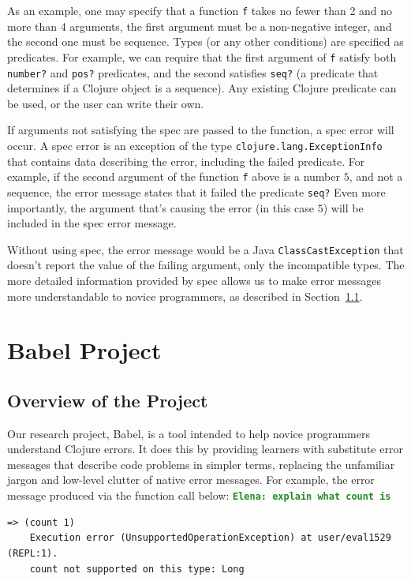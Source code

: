 \documentclass[12pt]{article}
\newcommand{\comment}[1]{{\bf \tt  {#1}}}
\newcommand{\emcomment}[1]{\textcolor{ForestGreen}{\comment{Elena: {#1}}}}
\newcommand{\jscomment}[1]{\textcolor{olive}{\comment{Jaydon: {#1}}}}
\begin{document}
As an example, one may specify that a function \texttt{f} takes no fewer than 2 and no more than 4 arguments, the first argument must be a non-negative integer, and the second one must be sequence. 
Types (or any other conditions) are specified as predicates. 
For example, we can require that the first argument of \texttt{f} satisfy both \texttt{number?} and \texttt{pos?} predicates, and the second satisfies \texttt{seq?} (a predicate that determines if a Clojure object is a sequence).
Any existing Clojure predicate can be used, or the user can write their own. 

If arguments not satisfying the spec are passed to the function, a spec error will occur. 
A spec error is an exception of the type \texttt{clojure.lang.ExceptionInfo} that contains data describing the error, including the failed predicate.
For example, if the second argument of the function 
\texttt{f} above is a number $5$, and not a sequence, the error message states that it failed the predicate \texttt{seq?}
Even more importantly, the argument that's causing the error (in this case $5$) will be included in the spec error message.

Without using spec, the error message would be a Java \texttt{ClassCastException} that doesn't report the value of the failing argument, only the incompatible types. 
The more detailed information provided by spec allows us to make error messages more understandable to novice programmers, as described in Section~\ref{subsec:overview}. 

\section{Babel Project}\label{sec:babel}
\subsection{Overview of the Project}\label{subsec:overview}
Our research project, Babel, is a tool intended to help novice programmers understand Clojure errors. It does this by providing learners with substitute error messages that describe code problems in simpler terms, replacing the unfamiliar jargon and low-level clutter of native error messages. For example, the error message produced via the function call below: \emcomment{explain what count is}

\begin{lstlisting}[breaklines=true, basicstyle=\ttfamily]
    => (count 1)
    Execution error (UnsupportedOperationException) at user/eval1529 (REPL:1).
    count not supported on this type: Long
\end{lstlisting}
    
\end{document}
